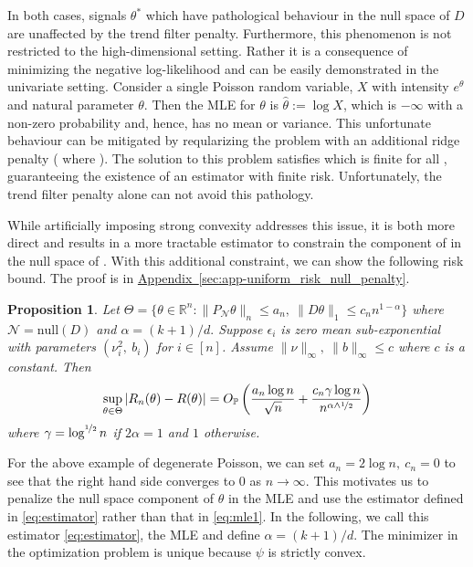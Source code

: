 \documentclass[ejs,noshowframe]{imsart}
\theoremstyle{plain}
\newtheorem{proposition}[theorem]{Proposition}
\theoremstyle{definition}
\newcommand{\aref}[1]{\hyperref[#1]{Appendix~\ref*{#1}}}
\renewcommand{\P}{\mathbb{P}}
\newcommand{\R}{\mathbb{R}}
\newcommand{\cN}{\mathcal{N}}
\renewcommand{\hat}{\widehat}
\newcommand{\half}{\nicefrac{1}{2}}
\begin{document}
In both cases, signals $\theta^*$ which have pathological behaviour in the null
space of $D$ are unaffected by the trend filter penalty. Furthermore, this
phenomenon is not restricted to the high-dimensional setting. Rather it is a
consequence of minimizing the negative log-likelihood and
can be easily demonstrated in the univariate setting. Consider a single Poisson
random variable, $X$ with intensity $e^\theta$ and natural parameter $\theta$.
Then the MLE for $\theta$ is $\hat \theta := \log X$, which is $-\infty$ with a
non-zero probability and, hence, has no mean or variance. This unfortunate behaviour
can be mitigated by reqularizing the problem with an additional ridge
penalty (  where ). The solution to this problem satisfies \smash{$e^{\hat \theta} = X -
2\lambda\hat\theta$} which is finite for all , guaranteeing the
existence of an estimator with finite risk. Unfortunately, the trend filter
penalty alone can not avoid this pathology.

While artificially imposing strong convexity addresses this issue, it
is both more direct and results in a more tractable estimator to 
constrain the
component of \smash{$\theta$} in the null space of .
With this additional constraint, we can show the following risk bound. 
The proof is in \aref{sec:app-uniform_risk_null_penalty}.
\begin{proposition}
	\label{prop:uniform_risk_null_penalty}
	Let $\Theta = \{ \theta \in \R^n : \|P_\cN \theta \|_n \le a_n,\ \|D\theta\|_1
	\le c_n n^{1-\alpha}\}$ where  
	$\cN ={\mathrm{null}}(D)$  and $\alpha = (k+1)/d.$
	Suppose $\epsilon_i$ is zero mean
	sub-exponential with parameters $(\nu_i^2,\ b_i)$ for $i\in [n]$.  
	Assume $\|\nu\|_\infty ,\ \| b \|_\infty \leq  c$ where $c$ is a constant. Then
	\begin{equation}
		\label{eq:uniform_risk}
		\sup_{\theta \in \Theta} |R_n(\theta) - R(\theta)| =  
		O_\P \left( \frac{a_n\log n}{ \sqrt{n}}+ \frac{c_n\gamma\log n}
    {n^{\alpha\wedge\half}}\right) 
	\end{equation}
	where $\gamma = \log^{\half} n$ if $2\alpha=1$ and $1$ otherwise.
\end{proposition}
For the above example of degenerate Poisson, we can set $a_n = 2 \log n,\ c_n =
0$ to see that the right hand side converges to 0 as $n \rightarrow \infty$. 
This motivates us to penalize the null space component of $\theta$ in the MLE
and use the estimator defined in \eqref{eq:estimator} rather than that in
\eqref{eq:mle1}. 
In the following, we call this estimator \eqref{eq:estimator}, the MLE and define $\alpha=(k+1)/d$.
The minimizer in the optimization problem is unique because $\psi$ is strictly
convex. 
\end{document}
